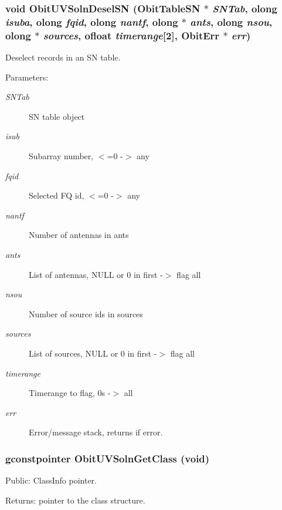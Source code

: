 \subsubsection{\setlength{\rightskip}{0pt plus 5cm}void Obit\-UVSoln\-Desel\-SN ({\bf Obit\-Table\-SN} $\ast$ {\em SNTab}, {\bf olong} {\em isuba}, {\bf olong} {\em fqid}, {\bf olong} {\em nantf}, {\bf olong} $\ast$ {\em ants}, {\bf olong} {\em nsou}, {\bf olong} $\ast$ {\em sources}, {\bf ofloat} {\em timerange}[2], {\bf Obit\-Err} $\ast$ {\em err})}\label{ObitUVSoln_8h_a29}


Deselect records in an SN table. 

\begin{Desc}
\item[Parameters:]
\begin{description}
\item[{\em SNTab}]SN table object \item[{\em isub}]Subarray number, $<$=0 -$>$ any \item[{\em fqid}]Selected FQ id, $<$=0 -$>$ any \item[{\em nantf}]Number of antennas in ants \item[{\em ants}]List of antennas, NULL or 0 in first -$>$ flag all \item[{\em nsou}]Number of source ids in sources \item[{\em sources}]List of sources, NULL or 0 in first -$>$ flag all \item[{\em timerange}]Timerange to flag, 0s -$>$ all \item[{\em err}]Error/message stack, returns if error. \end{description}
\end{Desc}
\subsubsection{\setlength{\rightskip}{0pt plus 5cm}gconstpointer Obit\-UVSoln\-Get\-Class (void)}\label{ObitUVSoln_8h_a20}


Public: Class\-Info pointer. 

\begin{Desc}
\item[Returns:]pointer to the class structure. \end{Desc}
